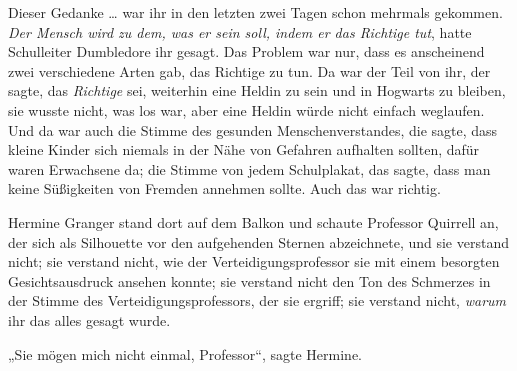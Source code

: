 Dieser Gedanke …
war ihr in den letzten zwei Tagen schon mehrmals gekommen.
\emph{Der Mensch wird zu dem, was er sein soll, indem er das Richtige tut}, hatte Schulleiter Dumbledore ihr gesagt. Das Problem war nur, dass es anscheinend zwei verschiedene Arten gab, das Richtige zu tun. Da war der Teil von ihr, der sagte, das \emph{Richtige} sei, weiterhin eine Heldin zu sein und in Hogwarts zu bleiben, sie wusste nicht, was los war, aber eine Heldin würde nicht einfach weglaufen.
%
Und da war auch die Stimme des gesunden Menschenverstandes, die sagte, dass kleine Kinder sich niemals in der Nähe von Gefahren aufhalten sollten, dafür waren Erwachsene da; die Stimme von jedem Schulplakat, das sagte, dass man keine Süßigkeiten von Fremden annehmen sollte. Auch das war richtig.

Hermine Granger stand dort auf dem Balkon und schaute Professor Quirrell an, der sich als Silhouette vor den aufgehenden Sternen abzeichnete, und sie verstand nicht; sie verstand nicht, wie der Verteidigungsprofessor sie mit einem besorgten Gesichtsausdruck ansehen konnte; sie verstand nicht den Ton des Schmerzes in der Stimme des Verteidigungsprofessors, der sie ergriff; sie verstand nicht, \emph{warum} ihr das alles gesagt wurde.

„Sie mögen mich nicht einmal, Professor“, sagte Hermine.

